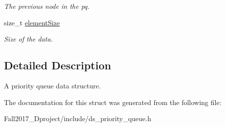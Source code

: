 \begin{DoxyCompactItemize}
\begin{DoxyCompactList}\small\item\em The previous node in the pq. \end{DoxyCompactList}\item 
\mbox{\label{structpriorityqueue_a10605873a540a86bb3e0daede286d6e1}} 
size\+\_\+t \hyperlink{structpriorityqueue_a10605873a540a86bb3e0daede286d6e1}{element\+Size}
\begin{DoxyCompactList}\small\item\em Size of the data. \end{DoxyCompactList}\end{DoxyCompactItemize}


\subsection{Detailed Description}
A priority queue data structure. 

The documentation for this struct was generated from the following file\+:\begin{DoxyCompactItemize}
\item 
Fall2017\+\_\+Dproject/include/ds\+\_\+priority\+\_\+queue.\+h\end{DoxyCompactItemize}
